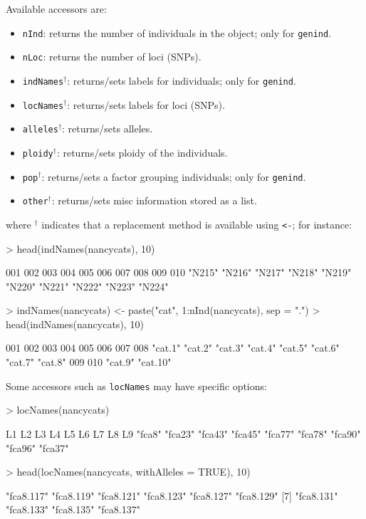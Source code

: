 \documentclass{article}
\begin{document}
Available accessors are:
\begin{itemize}
  \item \texttt{nInd}: returns the number of individuals in the object; only for \texttt{genind}.
  \item \texttt{nLoc}: returns the number of loci (SNPs).
  \item \texttt{indNames}$^{\dagger}$: returns/sets labels for individuals; only for \texttt{genind}.
  \item \texttt{locNames}$^{\dagger}$: returns/sets labels for loci (SNPs).
  \item \texttt{alleles}$^{\dagger}$: returns/sets alleles.
  \item \texttt{ploidy}$^{\dagger}$: returns/sets ploidy of the individuals.
  \item \texttt{pop}$^{\dagger}$: returns/sets a factor grouping individuals; only for \texttt{genind}.
  \item \texttt{other}$^{\dagger}$: returns/sets misc information stored as a list.
\end{itemize}
where $^{\dagger}$ indicates that a replacement method is available using \texttt{<-}; for instance:
\begin{Schunk}
\begin{Sinput}
> head(indNames(nancycats), 10)
\end{Sinput}
\begin{Soutput}
   001    002    003    004    005    006    007    008    009    010 
"N215" "N216" "N217" "N218" "N219" "N220" "N221" "N222" "N223" "N224" 
\end{Soutput}
\begin{Sinput}
> indNames(nancycats) <- paste("cat", 1:nInd(nancycats), sep = ".")
> head(indNames(nancycats), 10)
\end{Sinput}
\begin{Soutput}
     001      002      003      004      005      006      007      008 
 "cat.1"  "cat.2"  "cat.3"  "cat.4"  "cat.5"  "cat.6"  "cat.7"  "cat.8" 
     009      010 
 "cat.9" "cat.10" 
\end{Soutput}
\end{Schunk}

Some accessors such as \texttt{locNames} may have specific options:
\begin{Schunk}
\begin{Sinput}
> locNames(nancycats)
\end{Sinput}
\begin{Soutput}
     L1      L2      L3      L4      L5      L6      L7      L8      L9 
 "fca8" "fca23" "fca43" "fca45" "fca77" "fca78" "fca90" "fca96" "fca37" 
\end{Soutput}
\begin{Sinput}
> head(locNames(nancycats, withAlleles = TRUE), 10)
\end{Sinput}
\begin{Soutput}
 [1] "fca8.117" "fca8.119" "fca8.121" "fca8.123" "fca8.127" "fca8.129"
 [7] "fca8.131" "fca8.133" "fca8.135" "fca8.137"
\end{Soutput}
\end{Schunk}
\end{document}
